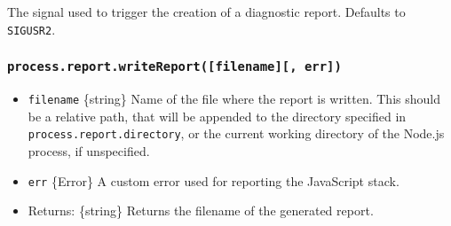 The signal used to trigger the creation of a diagnostic report. Defaults
to \texttt{\textquotesingle{}SIGUSR2\textquotesingle{}}.

\begin{Shaded}
\begin{Highlighting}[]
 \OperatorTok{;}

\NormalTok{(}\SpecialCharTok{$\{}\SpecialCharTok{\}}\VerbatimStringTok{\textasciigrave{}}\NormalTok{)}\OperatorTok{;}
\end{Highlighting}
\end{Shaded}

\begin{Shaded}
\begin{Highlighting}[]
\OperatorTok{=} \NormalTok{(}\NormalTok{)}\OperatorTok{;}

\NormalTok{(}\SpecialCharTok{$\{}\SpecialCharTok{\}}\VerbatimStringTok{\textasciigrave{}}\NormalTok{)}\OperatorTok{;}
\end{Highlighting}
\end{Shaded}

\subsubsection{\texorpdfstring{\texttt{process.report.writeReport({[}filename{]}{[},\ err{]})}}{process.report.writeReport({[}filename{]}{[}, err{]})}}\label{process.report.writereportfilename-err}

\begin{itemize}
\item
  \texttt{filename} \{string\} Name of the file where the report is
  written. This should be a relative path, that will be appended to the
  directory specified in \texttt{process.report.directory}, or the
  current working directory of the Node.js process, if unspecified.
\item
  \texttt{err} \{Error\} A custom error used for reporting the
  JavaScript stack.
\item
  Returns: \{string\} Returns the filename of the generated report.
\end{itemize}

